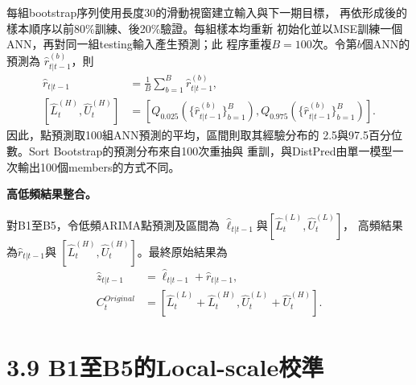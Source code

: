 每組bootstrap序列使用長度30的滑動視窗建立輸入與下一期目標，
再依形成後的樣本順序以前80\%訓練、後20\%驗證。每組樣本均重新
初始化並以MSE訓練一個ANN，再對同一組testing輸入產生預測；此
程序重複$B=100$次。令第$b$個ANN的預測為
$\widehat r_{t|t-1}^{(b)}$，則
\begin{align}
 \widehat r_{t|t-1}
 &=\frac{1}{B}\sum_{b=1}^{B}\widehat r_{t|t-1}^{(b)},\\
 [\widehat L_t^{(H)},\widehat U_t^{(H)}]
 &=\left[Q_{0.025}
 \left(\{\widehat r_{t|t-1}^{(b)}\}_{b=1}^{B}\right),
 Q_{0.975}
 \left(\{\widehat r_{t|t-1}^{(b)}\}_{b=1}^{B}\right)\right].
\end{align}
因此，點預測取100組ANN預測的平均，區間則取其經驗分布的
2.5與97.5百分位數。Sort Bootstrap的預測分布來自100次重抽與
重訓，與DistPred由單一模型一次輸出100個members的方式不同。

\medskip
\noindent\textbf{高低頻結果整合。}

對B1至B5，令低頻ARIMA點預測及區間為
$\widehat\ell_{t|t-1}$與$[\widehat L_t^{(L)},\widehat U_t^{(L)}]$，
高頻結果為$\widehat r_{t|t-1}$與
$[\widehat L_t^{(H)},\widehat U_t^{(H)}]$。最終原始結果為
\begin{align}
 \widehat z_{t|t-1}
 &=\widehat\ell_{t|t-1}+\widehat r_{t|t-1},\\
 C_t^{Original}
 &=\left[\widehat L_t^{(L)}+\widehat L_t^{(H)},
          \widehat U_t^{(L)}+\widehat U_t^{(H)}\right].
\end{align}

\section*{3.9 B1至B5的Local-scale校準}

